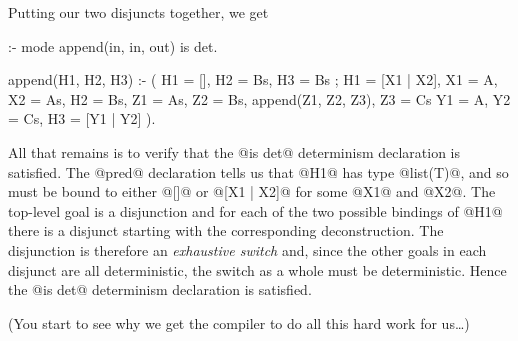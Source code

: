 Putting our two disjuncts together, we get
\begin{myverbatim}
:- mode append(in, in, out) is det.

append(H1, H2, H3) :-
    (
        H1 = [],
        H2 = Bs,
        H3 = Bs
    ;
        H1 = [X1 | X2],  X1 = A,  X2 = As,
        H2 = Bs,
        Z1 = As,  Z2 = Bs,  append(Z1, Z2, Z3),  Z3 = Cs
        Y1 = A,   Y2 = Cs,  H3 = [Y1 | Y2]
    ).
\end{myverbatim}
All that remains is to verify that the @is det@ determinism declaration
is satisfied.  The @pred@ declaration tells us that @H1@ has type
@list(T)@, and so must be bound to either @[]@ or @[X1 | X2]@ for some
@X1@ and @X2@.  The top-level goal is a disjunction and for each of the
two possible bindings of @H1@ there is a disjunct starting with the
corresponding deconstruction.  The disjunction is therefore an
\emph{exhaustive switch} and, since the other goals in each disjunct are
all deterministic, the switch as a whole must be deterministic.  Hence
the @is det@ determinism declaration is satisfied.

(You start to see why we get the compiler to do all this hard work for
us\ldots)

